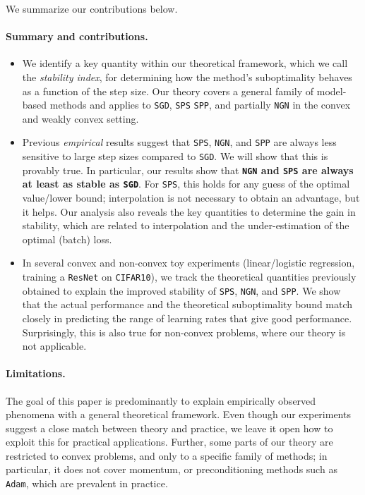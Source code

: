 \documentclass{article}
\newcommand{\Adam}{{\texttt{Adam}}}
\newcommand{\SGD}{{\texttt{SGD}}}
\newcommand{\SPP}{{\texttt{SPP}}}
\newcommand{\SPS}{{\texttt{SPS}}}
\newcommand{\NGN}{{\texttt{NGN}}}
\theoremstyle{plain}
\theoremstyle{definition}
\theoremstyle{remark}
\begin{document}
We summarize our contributions below.

\paragraph{Summary and contributions.} 
\begin{itemize}
    \item We identify a key quantity within our theoretical framework, which we call the \emph{stability index}, for determining how the method's suboptimality behaves as a function of the step size. Our theory covers a general family of model-based methods and applies to \SGD{}, \SPS{} \SPP{}, and partially \NGN{} in the convex and weakly convex setting. 
    \item Previous \emph{empirical} results suggest that \SPS{}, \NGN{}, and \SPP{} are always less sensitive to large step sizes compared to \SGD{}.  We will show that this is provably true.
    In particular, our results show that \textbf{\NGN{} and \SPS{} are always at least as stable as \SGD{}}. For \SPS{}, this holds for any guess of the optimal value/lower bound; interpolation is not necessary to obtain an advantage, but it helps.
    Our analysis also reveals the key quantities to determine the gain in stability, which are related to interpolation and the under-estimation of the optimal (batch) loss. 
    \item In several convex and non-convex toy experiments (linear/logistic regression, training a \texttt{ResNet} on \texttt{CIFAR10}), we track the theoretical quantities previously obtained to explain the improved stability of \SPS{}, \NGN{}, and \SPP{}. We show that the actual performance and the theoretical suboptimality bound match closely in predicting the range of learning rates that give good performance. Surprisingly, this is also true for non-convex problems, where our theory is not applicable.
\end{itemize}

\paragraph{Limitations.} The goal of this paper is predominantly to explain empirically observed phenomena with a general theoretical framework. Even though our experiments suggest a close match between theory and practice, we leave it open how to exploit this for practical applications. Further, some parts of our theory are restricted to convex problems, and only to a specific family of methods; in particular, it does not cover momentum, or preconditioning methods such as \Adam{}, which are prevalent in practice.
\end{document}
